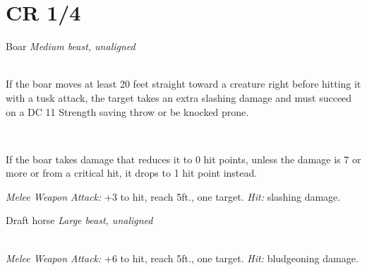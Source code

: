 \documentclass[10pt,twoside,twocolumn,openany]{book}
\begin{document}
\section{CR 1/4}

\begin{monsterboxnobg}{Boar}
	\textit{Medium beast, unaligned}\\
	\hline
	\basics[
		armorclass	= 11,
		hitpoints 		= \dice{2d8 + 2},
		speed		= {40 ft.}
	]
	\hline
	\stats[
		STR	= \stat{13},
		DEX	= \stat{11},
		CON	= \stat{12},
		INT	= \stat{2},
		WIS	= \stat{9},
		CHA	= \stat{5}
	]
	\hline
	\details[
		skills			= {},
		senses 		= {passive Perception 9},
		languages		= {-},
		challenge 		= 1/4
	]
	\hline \\[1mm]
	\begin{monsteraction}[Charge]
		If the boar moves at least 20 feet straight toward a creature right before hitting it with a tusk attack, the target takes an extra  slashing damage and must succeed on a DC 11 Strength saving throw or be knocked prone.
	\end{monsteraction}\\
	\begin{monsteraction}
		If the boar takes damage that reduces it to 0 hit points, unless the damage is 7 or more or from a critical hit, it drops to 1 hit point instead.
	\end{monsteraction}
	\begin{monsteraction}[Tusk]
		\textit{Melee Weapon Attack:} +3 to hit, reach 5ft., one target. \textit{Hit:}  slashing damage.
	\end{monsteraction}
\end{monsterboxnobg}

\begin{monsterboxnobg}{Draft horse}
	\textit{Large beast, unaligned}\\
	\hline
	\basics[
		armorclass	= 10,
		hitpoints 		= \dice{3d10 + 3},
		speed		= {40 ft.}
	]
	\hline
	\stats[
		STR	= \stat{18},
		DEX	= \stat{10},
		CON	= \stat{12},
		INT	= \stat{2},
		WIS	= \stat{11},
		CHA	= \stat{7}
	]
	\hline
	\details[
		skills			= {},
		senses		= {passive Perception 10},
		languages		= {-},
		challenge		= 1/4
	]
	\hline \\[1mm]
	\begin{monsteraction}[Hooves]
		\textit{Melee Weapon Attack:} +6 to hit, reach 5ft., one target. \textit{Hit:}  bludgeoning damage.
	\end{monsteraction}
\end{monsterboxnobg}
\end{document}
